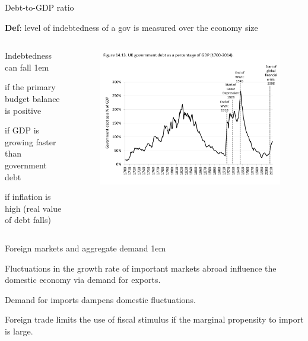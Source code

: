 \documentclass[11pt,aspectratio=43,usenames,dvipsnames]{beamer}
\let\olditemize=\itemize
\let\endolditemize=\enditemize
\renewenvironment{itemize}{\olditemize \itemsep1em}{\endolditemize}
\theoremstyle{definition}
\begin{document}
\begin{frame}{Debt-to-GDP ratio}
\label{slide:Debt_to_GDP_ratio}
    \begin{center}
        \textbf{Def}:  level of indebtedness of a gov is measured over the economy size
    \end{center}
    \begin{columns}
        \begin{column}{0.3\textwidth}
            Indebtedness can fall
            \begin{itemize}
                \item if the primary budget balance is positive
                \item if GDP is growing faster than government debt
                \item if inflation is high (real value of debt falls)
            \end{itemize}


        \end{column}
        \begin{column}{0.7\textwidth}
            \begin{figure}
                \centering
                \includegraphics[width=\textwidth]{./figures/17.pdf}
            \end{figure}

        \end{column}
    \end{columns}

\end{frame}

\begin{frame}{Foreign markets and aggregate demand}
\label{slide:Foreign_markets_and_aggregate_demand}
    \begin{itemize}
        \item Fluctuations in the growth rate of important markets abroad influence the domestic economy via demand for exports.
        \item Demand for imports dampens domestic fluctuations.
        \item Foreign trade limits the use of fiscal stimulus if the marginal propensity to import is large.
    \end{itemize}


\end{frame}
\end{document}
